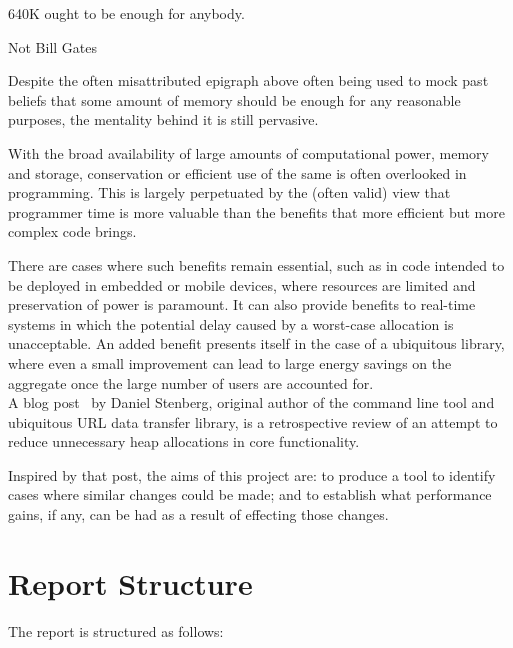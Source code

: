 \epigraph{640K ought to be enough for anybody.}{Not Bill Gates}

Despite the often misattributed epigraph above often being used to mock past beliefs that some amount of memory should be enough for any reasonable purposes, the mentality behind it is still pervasive.

With the broad availability of large amounts of computational power, memory and storage, conservation or efficient use of the same is often overlooked in programming. This is largely perpetuated by the (often valid) view that programmer time is more valuable than the benefits that more efficient but more complex code brings.

There are cases where such benefits remain essential, such as in code intended to be deployed in embedded or mobile devices, where resources are limited and preservation of power is paramount. It can also provide benefits to real-time systems in which the potential delay caused by a worst-case allocation is unacceptable. An added benefit presents itself in the case of a ubiquitous library, where even a small improvement can lead to large energy savings on the aggregate once the large number of users are accounted for.\\
A blog post~\cite{curlmalloc} by Daniel Stenberg, original author of the  command line tool and ubiquitous URL data transfer library, is a retrospective review of an attempt to reduce unnecessary heap allocations in core functionality.

Inspired by that post, the aims of this project are: to produce a tool to identify cases where similar changes could be made; and to establish what performance gains, if any, can be had as a result of effecting those changes.

\section{Report Structure}

The report is structured as follows:

